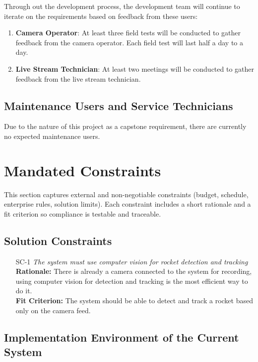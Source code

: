 \documentclass[12pt]{article}
\begin{document}
Through out the development process, the development team will continue to
iterate on the requirements based on feedback from these users:

\begin{enumerate}
  \item \textbf{Camera Operator}: At least three field tests will be conducted
        to gather feedback from the camera operator. Each field test will last
        half a day to a day.
  \item \textbf{Live Stream Technician}: At least two meetings will be conducted
        to gather feedback from the live stream technician.
\end{enumerate}

\subsection{Maintenance Users and Service Technicians}

Due to the nature of this project as a capstone requirement, there are
currently no expected maintenance users.

\section{Mandated Constraints}
This section captures external and non-negotiable constraints (budget, schedule, enterprise rules, solution limits).
Each constraint includes a short rationale and a fit criterion so compliance is testable and traceable.
\subsection{Solution Constraints}

\begin{itemize}[leftmargin=*]
  \item[SC-1] \emph{The system must use computer vision for rocket detection and
          tracking}\\[2mm]
        \textbf{Rationale:} There is already a camera connected to the system for recording, using computer vision for detection and tracking is the most efficient way to do it. \\
        \textbf{Fit Criterion:} The system should be able to detect and track a rocket based only on the camera feed.
\end{itemize}

\subsection{Implementation Environment of the Current System}
\end{document}
